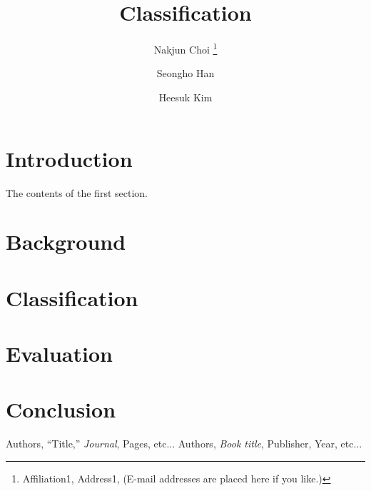 \documentclass[a4paper]{article}
\begin{document}
\title{
  Classification    %
}

\author{
  Nakjun Choi%
  \thanks{
    Affiliation1, Address1,   %
    (E-mail addresses are placed here if you like.)
  }
  \and
  Seongho Han
  \and
  Heesuk Kim
}

\maketitle

\section{Introduction}

The contents of the first section.

\section{Background}



\section{Classification}



\section{Evaluation}



\section{Conclusion}



\begin{thebibliography}{9}
Authors, ``Title,'' {\em Journal}, Pages, etc...
Authors, {\em Book title}, Publisher, Year, etc...
\end{thebibliography}
\end{document}
